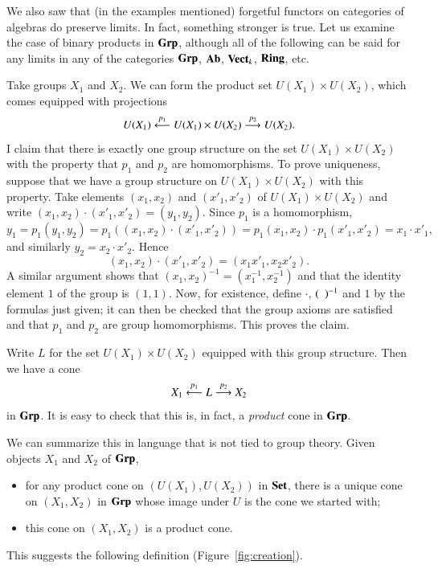 \begin{example} 
\label{eg:gp-creation}
%
%
%
%
We also saw that (in the examples mentioned) forgetful functors on
categories of algebras do preserve limits.  In fact, something stronger is
true.  Let us examine the case of binary products in $\mathbf{Grp}$, although all
of the following can be said for any limits in any of the categories
$\mathbf{Grp}$, $\mathbf{Ab}$, $\mathbf{Vect}_k$, $\mathbf{Ring}$, etc.

Take groups $X_1$ and $X_2$.  We can form the product set $U(X_1) \times
U(X_2)$, which comes equipped with projections
\[
U(X_1) \stackrel{p_1}{\longleftarrow} U(X_1) \times U(X_2) \stackrel{p_2}{\longrightarrow} U(X_2).
\]
I claim that there is exactly one group structure on the set $U(X_1) \times
U(X_2)$ with the property that $p_1$ and $p_2$ are homomorphisms.  To prove
uniqueness, suppose that we have a group structure on $U(X_1) \times U(X_2)$
with this property.  Take elements $(x_1, x_2)$ and $(x'_1, x'_2)$ of
$U(X_1) \times U(X_2)$ and write $(x_1, x_2) \cdot (x'_1, x'_2) = (y_1,
y_2)$.  Since $p_1$ is a homomorphism,
\[
y_1
=
p_1(y_1, y_2)
=
p_1((x_1, x_2) \cdot (x'_1, x'_2))
=
p_1(x_1, x_2) \cdot p_1(x'_1, x'_2)
=
x_1 \cdot x'_1,
\]
and similarly $y_2 = x_2 \cdot x'_2$.  Hence 
\[
(x_1, x_2) \cdot (x'_1, x'_2) = (x_1 x'_1, x_2 x'_2).  
\]
A similar argument shows that $(x_1, x_2)^{-1} = (x_1^{-1}, x_2^{-1})$ and
that the identity element $1$ of the group is $(1, 1)$.  Now, for
existence, define $\cdot$, $(\hspace*{.5em})^{-1}$ and $1$ by the formulas just
given; it can then be checked that the group axioms are satisfied and that
$p_1$ and $p_2$ are group homomorphisms.  This proves the claim.

Write $L$ for the set $U(X_1) \times U(X_2)$ equipped with this group
structure.  Then we have a cone
\[
X_1 \stackrel{p_1}{\longleftarrow} L \stackrel{p_2}{\longrightarrow} X_2
\]
in $\mathbf{Grp}$.  It is easy to check that this is, in fact, a \emph{product}
cone in $\mathbf{Grp}$.

We can summarize this in language that is not tied to group theory.  Given
objects $X_1$ and $X_2$ of $\mathbf{Grp}$,
% 
\begin{itemize}
\item 
for any product cone on $(U(X_1), U(X_2))$ in $\mathbf{Set}$, there is a unique
cone on $(X_1, X_2)$ in $\mathbf{Grp}$ whose image under $U$ is the cone we started
with; 

\item 
this cone on $(X_1, X_2)$ is a product cone.
\end{itemize}
\end{example}
% 
This suggests the following definition (Figure~\ref{fig:creation}).


